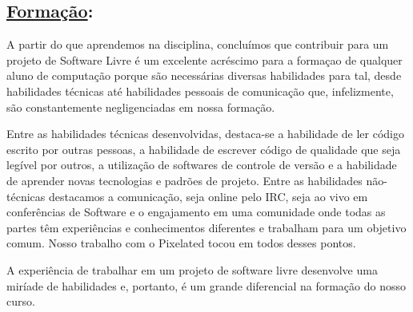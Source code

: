 \subsection*{\underline{Formação}:}

A partir do que aprendemos na disciplina, concluímos que contribuir para um
projeto de Software Livre é um excelente acréscimo para a formaçao de qualquer
aluno de computação porque são necessárias diversas habilidades para tal, desde
habilidades técnicas até habilidades pessoais de comunicação que, infelizmente,
são constantemente negligenciadas em nossa formação.

Entre as habilidades técnicas desenvolvidas, destaca-se a habilidade de ler
código escrito por outras pessoas, a habilidade de escrever código de qualidade
que seja legível por outros, a utilização de softwares de controle de versão e a
habilidade de aprender novas tecnologias e padrões de projeto. Entre as
habilidades não-técnicas destacamos a comunicação, seja online pelo IRC, seja ao
vivo em conferências de Software e o engajamento em uma comunidade onde todas as
partes têm experiências e conhecimentos diferentes e trabalham para um objetivo
comum. Nosso trabalho com o Pixelated tocou em todos desses pontos.

A experiência de trabalhar em um projeto de software livre desenvolve uma
miríade de habilidades e, portanto, é um grande diferencial na formação do
nosso curso.
